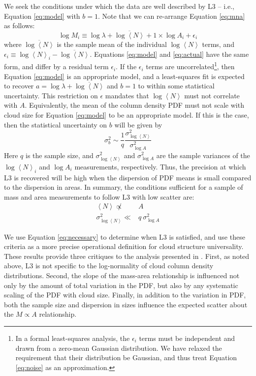 We seek the conditions under which the data are well described by L3 -- i.e., Equation \ref{eq:model} with $b=1$. Note that we can re-arrange Equation \ref{eq:mna} as follows:
\begin{equation}
\log M_i \equiv \log \lambda + \overline{\log \left< N\right>} + 1 \times \log A_i + \epsilon_i
\label{eq:actual}
\end{equation}
where $\overline{\log \left<N\right>}$ is the sample mean of the individual $\log \left<N\right>$ terms, and $\epsilon_i \equiv \log \left<N\right>_i - \overline{\log \left< N \right>}$. Equations \ref{eq:model} and \ref{eq:actual} have the same form, and differ by a residual term $\epsilon_i$. If the $\epsilon_i$ terms are uncorrelated\footnote{In a formal least-squares analysis, the $\epsilon_i$ terms must be independent and drawn from a zero-mean Gaussian distribution. We have relaxed the requirement that their distribution be Gaussian, and thus treat Equation \ref{eq:noise} as an approximation.}, then Equation \ref{eq:model} is an appropriate model, and a least-squares fit is expected to recover $a = \log \lambda + \overline{\log \left< N \right>}$ and $b=1$ to within some statistical uncertainty. This restriction on $\epsilon$ mandates that $\log \left<N\right>$ must not correlate with $A$. Equivalently, the mean of the column density PDF must not scale with cloud size for Equation \ref{eq:model} to be an appropriate model. If this is the case, then the statistical uncertainty on $b$ will be given by \citep[section 15.2]{Press07}
\begin{equation}
\sigma^2_b \sim \frac1{q} \frac{\sigma^2_{\log \left< N \right>}}{\sigma^2_{\log A}}
\label{eq:noise}
\end{equation}
Here $q$ is the sample size, and $\sigma^2_{\log \left< N \right>}$ and $\sigma^2_{\log A}$ are the sample variances of the $\log \left<N\right>_i$ and $\log A_i$ measurements, respectively. Thus, the precision at which L3 is recovered will be high when the dispersion of PDF means is small compared to the dispersion in areas. In summary, the conditions sufficient for a sample of mass and area measurements to follow L3 with low scatter are:
\begin{eqnarray}
\nonumber \left<N\right> \not \propto& A \\
\sigma_{\log \left<N\right>}^2 \ll & q ~ \sigma_{\log A}^2
\label{eq:necessary}
\end{eqnarray}

We use Equation \ref{eq:necessary} to determine when L3 is satisfied, and use these criteria as a more precise operational definition for cloud structure universality. These results provide three critiques to the analysis presented in \cite{Lombardi10}. First, as noted above, L3 is not specific to the log-normality of cloud column density distributions. Second, the slope of the mass-area relationship is influenced not only by the amount of total variation in the PDF, but also by any systematic scaling of the PDF with cloud size. Finally, in addition to the variation in PDF, both the sample size and dispersion in sizes influence the expected scatter about the $M \propto A$ relationship.

